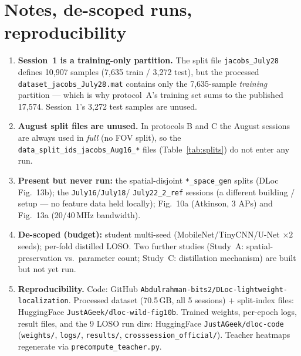 \documentclass[11pt]{article}
\newcommand{\file}[1]{\texttt{#1}}
\begin{document}
\section{Notes, de-scoped runs, reproducibility}
\begin{enumerate}[leftmargin=1.5em]
\item\label{note:jul28} \textbf{Session~1 is a training-only partition.} The
split file \file{jacobs\_July28} defines 10{,}907 samples (7{,}635 train /
3{,}272 test), but the processed \file{dataset\_jacobs\_July28.mat} contains only
the 7{,}635-sample \emph{training} partition --- which is why protocol~A's training
set sums to the published 17{,}574. Session~1's 3{,}272 test samples are unused.

\item \textbf{August split files are unused.} In protocols B and C the August
sessions are always used in \emph{full} (no FOV split), so the
\file{data\_split\_ids\_jacobs\_Aug16\_*} files (Table~\ref{tab:splits}) do not
enter any run.

\item \textbf{Present but never run:} the spatial-disjoint
\file{*\_space\_gen} splits (DLoc Fig.\ 13b); the \file{July16}/\file{July18}/
\file{July22\_2\_ref} sessions (a different building / setup --- no feature data
held locally); Fig.\ 10a (Atkinson, 3 APs) and Fig.\ 13a (20/40\,MHz bandwidth).

\item \textbf{De-scoped (budget):} student multi-seed (MobileNet/TinyCNN/U-Net
$\times2$ seeds); per-fold distilled LOSO. Two further studies (Study~A:
spatial-preservation vs.\ parameter count; Study~C: distillation mechanism) are
built but not yet run.

\item \textbf{Reproducibility.} Code: GitHub
\file{Abdulrahman-bits2/DLoc-lightweight-localization}. Processed dataset
(70.5\,GB, all 5 sessions) $+$ split-index files: HuggingFace
\file{JustAGeek/dloc-wild-fig10b}. Trained weights, per-epoch logs, result
files, and the 9 LOSO run dirs: HuggingFace \file{JustAGeek/dloc-code}
(\file{weights/}, \file{logs/}, \file{results/}, \file{crosssession\_official/}).
Teacher heatmaps regenerate via \file{precompute\_teacher.py}.
\end{enumerate}
\end{document}
